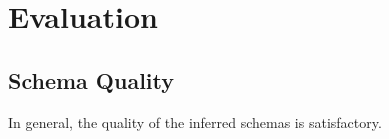 
\chapter{Evaluation}
\label{ch:Evaluation}

\section{Schema Quality}
\label{sec:Evaluation:quality}

In general, the quality of the inferred schemas is satisfactory.





